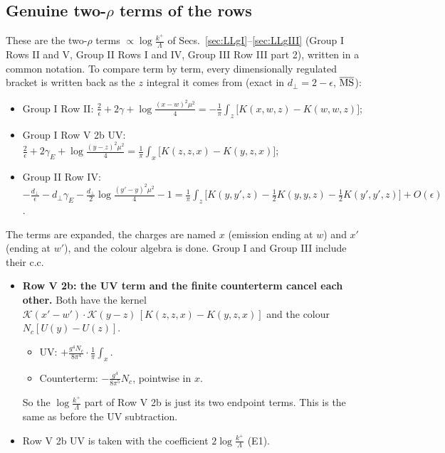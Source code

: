 \documentclass[10pt]{article}
\numberwithin{equation}{section}
\begin{document}
\subsection{Genuine two-$\rho$ terms of the rows}\label{sec:gen}
These are the two-$\rho$ terms $\propto\log\frac{k^+}{\Lambda}$ of Secs.~\ref{sec:LLgI}--\ref{sec:LLgIII} (Group I Rows II and V, Group II Rows I and IV, Group III Row III part 2), written in a common notation. To compare term by term, every dimensionally regulated bracket is written back as the $z$ integral it comes from (exact in $d_\perp=2-\epsilon$, $\overline{\rm MS}$):
\begin{itemize}
\item Group I Row II: $\frac{2}{\epsilon}+2\gamma+\log\frac{(x-w)^2\mu^2}{4}=-\frac1\pi\int_z\big[K(x,w,z)-K(w,w,z)\big]$;
\item Group I Row V 2b UV: $\frac{2}{\epsilon}+2\gamma_E+\log\frac{(y-z)^2\mu^2}{4}=\frac1\pi\int_x\big[K(z,z,x)-K(y,z,x)\big]$;
\item Group II Row IV: $-\frac{d_\perp}{\epsilon}-d_\perp\gamma_E-\frac{d_\perp}{2}\log\frac{(y'-y)^2\mu^2}{4}-1=\frac1\pi\int_z\big[K(y,y',z)-\frac12K(y,y,z)-\frac12K(y',y',z)\big]+O(\epsilon)$.
\end{itemize}
The terms are expanded, the charges are named $x$ (emission ending at $w$) and $x'$ (ending at $w'$), and the colour algebra is done. Group I and Group III include their c.c.
\begin{itemize}
\item \textbf{Row V 2b: the UV term and the finite counterterm cancel each other.} Both have the kernel $\mathcal K(x'-w')\cdot\mathcal K(y-z)\,[K(z,z,x)-K(y,z,x)]$ and the colour $N_c[U(y)-U(z)]$.
\begin{itemize}
\item UV: $+\frac{g^4N_c}{8\pi^4}\cdot\frac1\pi\int_x$.
\item Counterterm: $-\frac{g^4}{8\pi^5}N_c$, pointwise in $x$.
\end{itemize}
So the $\log\frac{k^+}{\Lambda}$ part of Row V 2b is just its two endpoint terms. This is the same as before the UV subtraction.
\item Row V 2b UV is taken with the coefficient $2\log\frac{k^+}{\Lambda}$ (E1).
\end{itemize}
\end{document}
